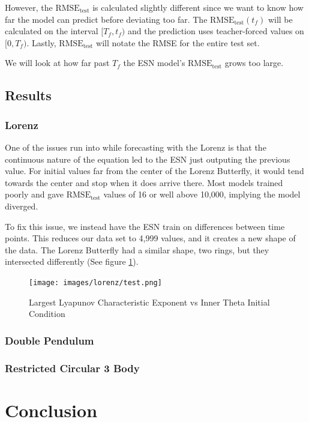 \documentclass{article}
\begin{document}
However, the $\text{RMSE}_\text{test}$ is calculated slightly different
since we want to know how far the model can predict before deviating too
far. The $\text{RMSE}_\text{test}(t_f)$ will be calculated on the interval
$[T_f, t_f)$ and the prediction uses teacher-forced values on $[0, T_f)$.
Lastly, $\text{RMSE}_\text{test}$ will notate the RMSE for the entire test
set.

We will look at how far past $T_f$ the ESN model's
$\text{RMSE}_\text{test}$ grows too large.

\subsection{Results}
\subsubsection{Lorenz}

One of the issues run into while forecasting with the Lorenz is that the
continuous nature of the equation led to the ESN just outputing the
previous value. For initial values far from the center of the Lorenz
Butterfly, it would tend towards the center and stop when it does arrive
there. Most models trained poorly and gave $\text{RMSE}_\text{test}$
values of 16 or well above 10,000, implying the model diverged.

To fix this issue, we instead have the ESN train on differences between
time points. This reduces our data set to 4,999 values, and it creates
a new shape of the data. The Lorenz Butterfly had a similar shape, two rings, but they intersected differently (See figure \ref{fig:lorenz_diff}).

\begin{figure}[H]
    \centering
    \texttt{[image: images/lorenz/test.png]}
    \caption{Largest Lyapunov Characteristic Exponent vs Inner Theta Initial Condition}
    \label{fig:lorenz_diff}
\end{figure}


\subsubsection{Double Pendulum}
\subsubsection{Restricted Circular 3 Body}

\section{Conclusion}



\end{document}
